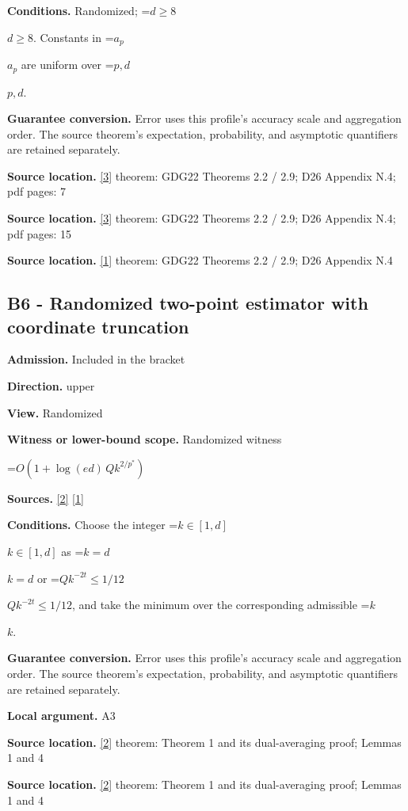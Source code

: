 \documentclass[10pt,a4paper]{article}
\newcommand{\AtlasMath}[1]{\par\begingroup\centering\setbox0=\hbox{$\displaystyle #1$}\ifdim\wd0>1.4\linewidth\typeout{ATLAS WIDE FORMULA: \the\wd0}\fi\ifdim\wd0>\linewidth\resizebox{\linewidth}{!}{\box0}\else\box0\fi\par\endgroup}
\newcommand{\AtlasInlineMath}[1]{\begingroup\setbox0=\hbox{$#1$}\ifdim\wd0>.4\linewidth\endgroup\AtlasMath{#1}\else\endgroup$#1$\fi}
\begin{document}
\textbf{Conditions.} Randomized; \AtlasInlineMath{d\ge8}. Constants in \AtlasInlineMath{a_p} are uniform over \AtlasInlineMath{p,d}.

\textbf{Guarantee conversion.} Error uses this profile's accuracy scale and aggregation order. The source theorem's expectation, probability, and asymptotic quantifiers are retained separately.

\textbf{Source location.} \href{https://arxiv.org/abs/1802.09022}{[3]} theorem: GDG22 Theorems 2.2 / 2.9; D26 Appendix N.4; pdf pages: 7

\textbf{Source location.} \href{https://arxiv.org/abs/1802.09022}{[3]} theorem: GDG22 Theorems 2.2 / 2.9; D26 Appendix N.4; pdf pages: 15

\textbf{Source location.} \href{https://arxiv.org/html/2610.00345v1}{[1]} theorem: GDG22 Theorems 2.2 / 2.9; D26 Appendix N.4

\subsection{B6 - Randomized two-point estimator with coordinate truncation}
\textbf{Admission.} Included in the bracket

\textbf{Direction.} upper

\textbf{View.} Randomized

\textbf{Witness or lower-bound scope.} Randomized witness

\AtlasMath{O(1+\log(ed)\,Q k^{2/p^*})}
\textbf{Sources.} \href{https://proceedings.neurips.cc/paper_files/paper/2022/file/329ef22fd8cb68223d5df09a037f7dd9-Paper-Conference.pdf}{[2]} \href{https://arxiv.org/html/2610.00345v1}{[1]}

\textbf{Conditions.} Choose the integer \AtlasInlineMath{k\in[1,d]} as \AtlasInlineMath{k=d} or \AtlasInlineMath{Qk^{-2t}\le1/12}, and take the minimum over the corresponding admissible \AtlasInlineMath{k}.

\textbf{Guarantee conversion.} Error uses this profile's accuracy scale and aggregation order. The source theorem's expectation, probability, and asymptotic quantifiers are retained separately.

\textbf{Local argument.} A3

\textbf{Source location.} \href{https://proceedings.neurips.cc/paper_files/paper/2022/file/329ef22fd8cb68223d5df09a037f7dd9-Paper-Conference.pdf}{[2]} theorem: Theorem 1 and its dual-averaging proof; Lemmas 1 and 4

\textbf{Source location.} \href{https://proceedings.neurips.cc/paper_files/paper/2022/file/329ef22fd8cb68223d5df09a037f7dd9-Paper-Conference.pdf}{[2]} theorem: Theorem 1 and its dual-averaging proof; Lemmas 1 and 4
\end{document}
